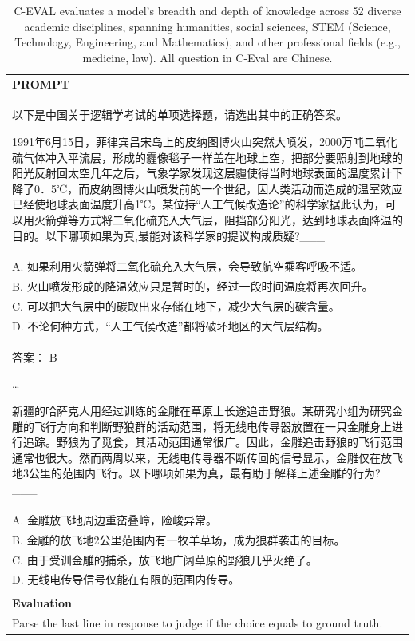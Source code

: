 \begin{table}[h]
    \centering \small
        \caption{C-EVAL evaluates a model's breadth and depth of knowledge across 52 diverse academic disciplines, spanning humanities, social sciences, STEM (Science, Technology, Engineering, and Mathematics), and other professional fields (e.g., medicine, law). All question in C-Eval are Chinese. }
    \label{tab:ceval_eval_format_example}
    \begin{tabular}{p{}}
    \hline
    \textbf{PROMPT}\\
以下是中国关于逻辑学考试的单项选择题，请选出其中的正确答案。

1991年6月15日，菲律宾吕宋岛上的皮纳图博火山突然大喷发，2000万吨二氧化硫气体冲入平流层，形成的霾像毯子一样盖在地球上空，把部分要照射到地球的阳光反射回太空几年之后，气象学家发现这层霾使得当时地球表面的温度累计下降了0．5℃，而皮纳图博火山喷发前的一个世纪，因人类活动而造成的温室效应已经使地球表面温度升高1℃。某位持“人工气候改造论”的科学家据此认为，可以用火箭弹等方式将二氧化硫充入大气层，阻挡部分阳光，达到地球表面降温的目的。以下哪项如果为真,最能对该科学家的提议构成质疑?\_\_\_ \\
A. 如果利用火箭弹将二氧化硫充入大气层，会导致航空乘客呼吸不适。\\
B. 火山喷发形成的降温效应只是暂时的，经过一段时间温度将再次回升。\\
C. 可以把大气层中的碳取出来存储在地下，减少大气层的碳含量。\\
D. 不论何种方式，“人工气候改造”都将破坏地区的大气层结构。\\
答案： B

\ldots

新疆的哈萨克人用经过训练的金雕在草原上长途追击野狼。某研究小组为研究金雕的飞行方向和判断野狼群的活动范围，将无线电传导器放置在一只金雕身上进行追踪。野狼为了觅食，其活动范围通常很广。因此，金雕追击野狼的飞行范围通常也很大。然而两周以来，无线电传导器不断传回的信号显示，金雕仅在放飞地3公里的范围内飞行。以下哪项如果为真，最有助于解释上述金雕的行为?\_\_\_ \\
A. 金雕放飞地周边重峦叠嶂，险峻异常。\\
B. 金雕的放飞地2公里范围内有一牧羊草场，成为狼群袭击的目标。\\
C. 由于受训金雕的捕杀，放飞地广阔草原的野狼几乎灭绝了。\\
D. 无线电传导信号仅能在有限的范围内传导。\\
\\ \hline
      \textbf{Evaluation}\\
      Parse the last line in response to judge if the choice equals to ground truth.
       \\ \hline
    \end{tabular}
\end{table}





